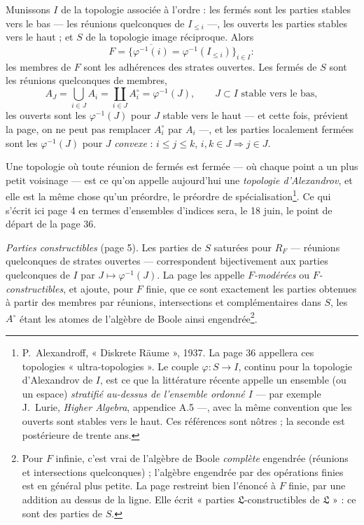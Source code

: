\documentclass[11pt,a4paper]{article}
\begin{document}
Munissons $I$ de la topologie associée à l'ordre : les fermés sont les parties
stables vers le bas --- les réunions quelconques de $I_{\leq i}$ ---, les
ouverts les parties stables vers le haut ; et $S$ de la topologie image
réciproque. Alors
\[
F = \bigl\{ \overline{\varphi^{-1}(i)} = \varphi^{-1}(I_{\leq i})
\bigr\}_{i \in I} :
\]
les membres de $F$ sont les adhérences des strates ouvertes. Les fermés de $S$
sont les réunions quelconques de membres,
\[
A_{J} = \bigcup_{i \in J} A_{i} = \coprod_{i \in J} A_{i}^{\circ} =
\varphi^{-1}(J), \qquad J \subset I \text{ stable vers le bas},
\]
les ouverts sont les $\varphi^{-1}(J)$ pour $J$ stable vers le haut --- et cette
fois, prévient la page, on ne peut pas remplacer $A_{i}^{\circ}$ par $A_{i}$
---, et les parties localement fermées sont les $\varphi^{-1}(J)$ pour $J$
\emph{convexe} : $i \leq j \leq k$, $i, k \in J \Rightarrow j \in J$.

Une topologie où toute réunion de fermés est fermée --- où chaque point a un
plus petit voisinage --- est ce qu'on appelle aujourd'hui une \emph{topologie
d'Alexandrov}, et elle est la même chose qu'un préordre, le préordre de
spécialisation\footnote{P.~Alexandroff, « Diskrete Räume », 1937. La page 36
appellera ces topologies « ultra-topologies ». Le couple $\varphi : S \to I$,
continu pour la topologie d'Alexandrov de $I$, est ce que la littérature récente
appelle un ensemble (ou un espace) \emph{stratifié au-dessus de l'ensemble
ordonné $I$} --- par exemple J.~Lurie, \emph{Higher Algebra}, appendice A.5 ---,
avec la même convention que les ouverts sont stables vers le haut. Ces
références sont nôtres ; la seconde est postérieure de trente ans.}. Ce qui
s'écrit ici page 4 en termes d'ensembles d'indices sera, le 18 juin, le point
de départ de la page 36.

\emph{Parties constructibles} (page 5). Les parties de $S$ saturées pour $R_{F}$
--- réunions quelconques de strates ouvertes --- correspondent bijectivement aux
parties quelconques de $I$ par $J \mapsto \varphi^{-1}(J)$. La page les appelle
\emph{$F$-modérées} ou \emph{$F$-constructibles}, et ajoute, pour $F$ finie,
que ce sont exactement les parties obtenues à partir des membres par réunions,
intersections et complémentaires dans $S$, les $A^{\circ}$ étant les atomes de
l'algèbre de Boole ainsi engendrée\footnote{Pour $F$ infinie, c'est vrai de
l'algèbre de Boole \emph{complète} engendrée (réunions et intersections
quelconques) ; l'algèbre engendrée par des opérations finies est en général
plus petite. La page restreint bien l'énoncé à $F$ finie, par une addition au
dessus de la ligne. Elle écrit « parties $\mathfrak{L}$-constructibles de
$\mathfrak{L}$ » : ce sont des parties de $S$.}.
\end{document}
